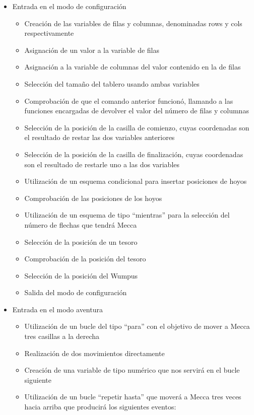 \documentclass[a4paper,12pt,twoside,openright]{report}
\begin{document}
  \begin{itemize}
   \item Entrada en el modo de configuración
   \begin{itemize}
    \item Creación de las variables de filas y columnas, denominadas rows y cols respectivamente
    \item Asignación de un valor a la variable de filas
    \item Asignación a la variable de columnas del valor contenido en la de filas
    \item Selección del tamaño del tablero usando ambas variables
    \item Comprobación de que el comando anterior funcionó, llamando a las funciones 
    encargadas de devolver el valor del número de filas y columnas
    \item Selección de la posición de la casilla de comienzo, cuyas coordenadas son el resultado de restar las dos variables anteriores
    \item Selección de la posición de la casilla de finalización, cuyas coordenadas son el resultado de restarle uno a las dos variables
    \item Utilización de un esquema condicional para insertar posiciones de hoyos
    \item Comprobación de las posiciones de los hoyos
    \item Utilización de un esquema de tipo ``mientras'' para la selección del número de flechas que tendrá Mecca
    \item Selección de la posición de un tesoro
    \item Comprobación de la posición del tesoro
    \item Selección de la posición del Wumpus
    \item Salida del modo de configuración
    \end{itemize}
   \item Entrada en el modo aventura
      \begin{itemize}
      \item Utilización de un bucle del tipo ``para'' con el objetivo de mover a Mecca tres casillas a la derecha
      \item Realización de dos movimientos directamente
      \item Creación de una variable de tipo numérico que nos servirá en el bucle siguiente
      \item Utilización de un bucle ``repetir hasta'' que moverá a Mecca tres veces hacia arriba que producirá los siguientes eventos:

\end{itemize}
\end{itemize}
\end{document}
